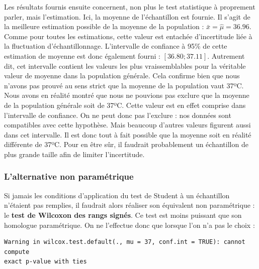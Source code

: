 \documentclass[
  a4paper,
]{article}
\newenvironment{Shaded}{\begin{snugshade}}{\end{snugshade}}
\newcommand{\DataTypeTok}[1]{\textcolor[rgb]{0.00,0.34,0.68}{#1}}
\newcommand{\DecValTok}[1]{\textcolor[rgb]{0.69,0.50,0.00}{#1}}
\newcommand{\KeywordTok}[1]{\textcolor[rgb]{0.12,0.11,0.11}{\textbf{#1}}}
\newcommand{\NormalTok}[1]{\textcolor[rgb]{0.12,0.11,0.11}{#1}}
\newcommand{\OperatorTok}[1]{\textcolor[rgb]{0.12,0.11,0.11}{#1}}
\newcommand{\OtherTok}[1]{\textcolor[rgb]{0.00,0.43,0.16}{#1}}
\newcommand{\StringTok}[1]{\textcolor[rgb]{0.75,0.01,0.01}{#1}}
\begin{document}
Les résultats fournis ensuite concernent, non plus le test statistique à proprement parler, mais l'estimation. Ici, la moyenne de l'échantillon est fournie. Il s'agit de la meilleure estimation possible de la moyenne de la population : \(\bar{x} = \hat{\mu} = 36.96\). Comme pour toutes les estimations, cette valeur est entachée d'incertitude liée à la fluctuation d'échantillonnage. L'intervalle de confiance à 95\% de cette estimation de moyenne est donc également fourni : \([36.80 ; 37.11]\). Autrement dit, cet intervalle contient les valeurs les plus vraissemblables pour la véritable valeur de moyenne dans la population générale. Cela confirme bien que nous n'avons pas prouvé au sens strict que la moyenne de la population vaut 37ºC. Nous avons en réalité montré que nous ne pouvions pas exclure que la moyenne de la population générale soit de 37ºC. Cette valeur est en effet comprise dans l'intervalle de confiance. On ne peut donc pas l'exclure : nos données sont compatibles avec cette hypothèse. Mais beaucoup d'autres valeurs figurent aussi dans cet intervalle. Il est donc tout à fait possible que la moyenne soit en réalité différente de 37ºC. Pour en être sûr, il faudrait probablement un échantillon de plus grande taille afin de limiter l'incertitude.

\hypertarget{lalternative-non-paramuxe9trique}{%
\subsubsection{L'alternative non paramétrique}\label{lalternative-non-paramuxe9trique}}

Si jamais les conditions d'application du test de Student à un échantillon n'étaient pas remplies, il faudrait alors réaliser son équivalent non paramétrique : le \textbf{test de Wilcoxon des rangs signés}. Ce test est moins puissant que son homologue paramétrique. On ne l'effectue donc que lorsque l'on n'a pas le choix :

\begin{Shaded}
\end{Shaded}

\begin{verbatim}
Warning in wilcox.test.default(., mu = 37, conf.int = TRUE): cannot compute
exact p-value with ties
\end{verbatim}
\end{document}
